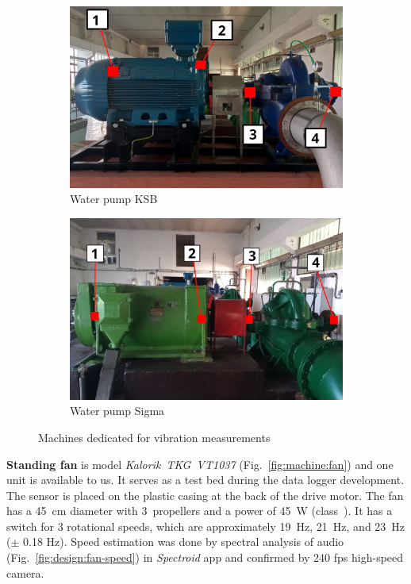\begin{figure}[h]
\begin{subfigure}[b]{0.49\textwidth}
        \includegraphics[width=\textwidth]{assets/design/sensor/ksb-pump.jpg}
        \caption{\footnotesize Water pump KSB}
        \label{fig:machine:pump-ksb}
    \end{subfigure}
    \hfill
    \begin{subfigure}[b]{0.49\textwidth}
    		\centering
        \includegraphics[width=\textwidth]{assets/design/sensor/sigma-pump.jpg}
        \caption{\footnotesize Water pump Sigma}
        \label{fig:machine:pump-sigma}
    \end{subfigure}
    \caption{Machines dedicated for vibration measurements}
    \label{fig:design:machines}
\end{figure}

\textbf{Standing fan} is model \emph{Kalorik~TKG~VT1037} (Fig.~\ref{fig:machine:fan}) and one unit is available to us. It serves as a test bed during the data logger development. The sensor is placed on the plastic casing at the back of the drive motor. The fan has a 45~cm diameter with 3~propellers and a power of 45~W (class~). It has a switch for 3 rotational speeds, which are approximately 19~Hz, 21~Hz, and 23~Hz ($\pm$ 0.18 Hz). Speed estimation was done by spectral analysis of audio (Fig.~\ref{fig:design:fan-speed}) in \emph{Spectroid} app and confirmed by 240 fps high-speed camera.

